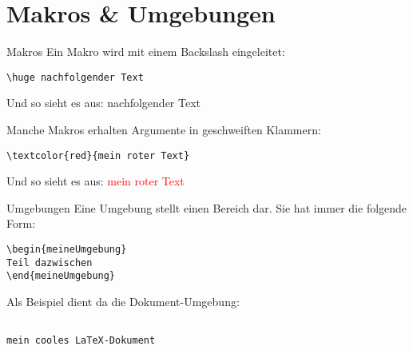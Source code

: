 \section{Makros \& Umgebungen}
\begin{frame}[fragile]{Makros}
Ein Makro wird mit einem Backslash eingeleitet:

\begin{lstlisting}[style=tex]
\huge nachfolgender Text
\end{lstlisting}

Und so sieht es aus: {\huge nachfolgender Text}

\vspace{2ex}
Manche Makros erhalten Argumente in geschweiften Klammern:
\begin{lstlisting}[style=tex]
\textcolor{red}{mein roter Text}
\end{lstlisting}

Und so sieht es aus: \textcolor{red}{mein roter Text}
\end{frame}

\begin{frame}[fragile]{Umgebungen}
Eine Umgebung stellt einen Bereich dar. Sie hat immer die folgende Form:

\begin{lstlisting}[style=tex]
\begin{meineUmgebung}
Teil dazwischen
\end{meineUmgebung}
\end{lstlisting}

Als Beispiel dient da die Dokument-Umgebung:

\begin{lstlisting}[style=tex]

mein cooles LaTeX-Dokument

\end{lstlisting}
\end{frame}